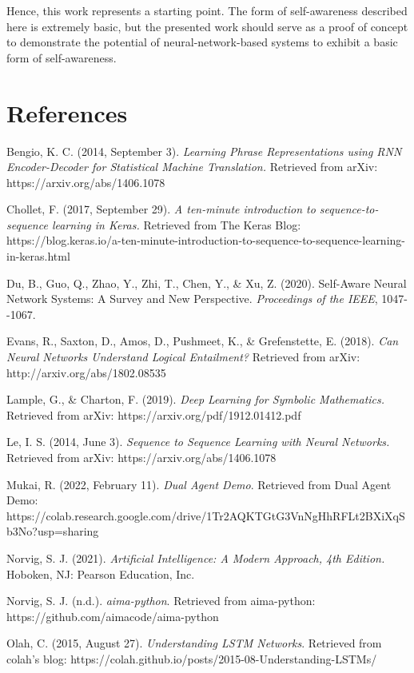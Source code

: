 \documentclass[
]{article}
\begin{document}
Hence, this work represents a starting point. The form of self-awareness
described here is extremely basic, but the presented work should serve
as a proof of concept to demonstrate the potential of
neural-network-based systems to exhibit a basic form of self-awareness.

\hypertarget{references}{%
\section{References}\label{references}}

Bengio, K. C. (2014, September 3). \emph{Learning Phrase Representations
using RNN Encoder-Decoder for Statistical Machine Translation.}
Retrieved from arXiv: https://arxiv.org/abs/1406.1078

Chollet, F. (2017, September 29). \emph{A ten-minute introduction to
sequence-to-sequence learning in Keras.} Retrieved from The Keras Blog:
https://blog.keras.io/a-ten-minute-introduction-to-sequence-to-sequence-learning-in-keras.html

Du, B., Guo, Q., Zhao, Y., Zhi, T., Chen, Y., \& Xu, Z. (2020).
Self-Aware Neural Network Systems: A Survey and New Perspective.
\emph{Proceedings of the IEEE}, 1047-\/-1067.

Evans, R., Saxton, D., Amos, D., Pushmeet, K., \& Grefenstette, E.
(2018). \emph{Can Neural Networks Understand Logical Entailment?}
Retrieved from arXiv: http://arxiv.org/abs/1802.08535

Lample, G., \& Charton, F. (2019). \emph{Deep Learning for Symbolic
Mathematics.} Retrieved from arXiv: https://arxiv.org/pdf/1912.01412.pdf

Le, I. S. (2014, June 3). \emph{Sequence to Sequence Learning with
Neural Networks.} Retrieved from arXiv: https://arxiv.org/abs/1406.1078

Mukai, R. (2022, February 11). \emph{Dual Agent Demo}. Retrieved from
Dual Agent Demo:
https://colab.research.google.com/drive/1Tr2AQKTGtG3VnNgHhRFLt2BXiXqSb3No?usp=sharing

Norvig, S. J. (2021). \emph{Artificial Intelligence: A Modern Approach,
4th Edition.} Hoboken, NJ: Pearson Education, Inc.

Norvig, S. J. (n.d.). \emph{aima-python}. Retrieved from aima-python:
https://github.com/aimacode/aima-python

Olah, C. (2015, August 27). \emph{Understanding LSTM Networks}.
Retrieved from colah's blog:
https://colah.github.io/posts/2015-08-Understanding-LSTMs/
\end{document}
